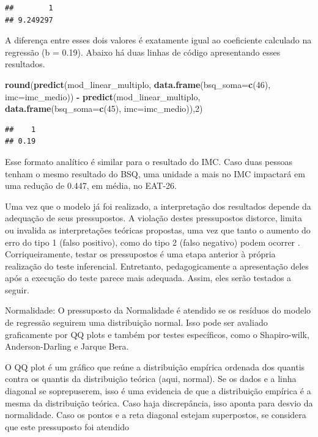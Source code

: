 \documentclass[
]{book}
\newenvironment{Shaded}{\begin{snugshade}}{\end{snugshade}}
\newcommand{\DataTypeTok}[1]{\textcolor[rgb]{0.13,0.29,0.53}{#1}}
\newcommand{\DecValTok}[1]{\textcolor[rgb]{0.00,0.00,0.81}{#1}}
\newcommand{\KeywordTok}[1]{\textcolor[rgb]{0.13,0.29,0.53}{\textbf{#1}}}
\newcommand{\NormalTok}[1]{#1}
\newcommand{\OperatorTok}[1]{\textcolor[rgb]{0.81,0.36,0.00}{\textbf{#1}}}
\newcommand{\StringTok}[1]{\textcolor[rgb]{0.31,0.60,0.02}{#1}}
\begin{document}
\begin{verbatim}
##        1 
## 9.249297
\end{verbatim}

A diferença entre esses dois valores é exatamente igual ao coeficiente calculado na regressão (b = 0.19). Abaixo há duas linhas de código apresentando esses resultados.

\begin{Shaded}
\begin{Highlighting}[]
\KeywordTok{round}\NormalTok{(}\KeywordTok{predict}\NormalTok{(mod_linear_multiplo, }\KeywordTok{data.frame}\NormalTok{(}\DataTypeTok{bsq_soma=}\KeywordTok{c}\NormalTok{(}\DecValTok{46}\NormalTok{), }\DataTypeTok{imc=}\NormalTok{imc_medio)) }\OperatorTok{-}\StringTok{ }\KeywordTok{predict}\NormalTok{(mod_linear_multiplo, }\KeywordTok{data.frame}\NormalTok{(}\DataTypeTok{bsq_soma=}\KeywordTok{c}\NormalTok{(}\DecValTok{45}\NormalTok{), }\DataTypeTok{imc=}\NormalTok{imc_medio)),}\DecValTok{2}\NormalTok{)}
\end{Highlighting}
\end{Shaded}

\begin{verbatim}
##    1 
## 0.19
\end{verbatim}

Esse formato analítico é similar para o resultado do IMC. Caso duas pessoas tenham o mesmo resultado do BSQ, uma unidade a mais no IMC impactará em uma redução de 0.447, em média, no EAT-26.

Uma vez que o modelo já foi realizado, a interpretação dos resultados depende da adequação de seus pressupostos. A violação destes pressupostos distorce, limita ou invalida as interpretações teóricas propostas, uma vez que tanto o aumento do erro do tipo 1 (falso positivo), como do tipo 2 (falso negativo) podem ocorrer \citep{Lix1996, Barker2015, Ernst2017}. Corriqueiramente, testar os pressupostos é uma etapa anterior à própria realização do teste inferencial. Entretanto, pedagogicamente a apresentação deles após a execução do teste parece mais adequada. Assim, eles serão testados a seguir.

Normalidade: O pressuposto da Normalidade é atendido se os resíduos do modelo de regressão seguirem uma distribuição normal. Isso pode ser avaliado graficamente por QQ plots e também por testes específicos, como o Shapiro-wilk, Anderson-Darling e Jarque Bera.

O QQ plot é um gráfico que reúne a distribuição empírica ordenada dos quantis contra os quantis da distribuição teórica (aqui, normal). Se os dados e a linha diagonal se soprepuserem, isso é uma evidencia de que a distribuição empírica é a mesma da distribuição teórica. Caso haja discrepância, isso aponta para desvio da normalidade. Caso os pontos e a reta diagonal estejam superpostos, se considera que este pressuposto foi atendido
\end{document}
